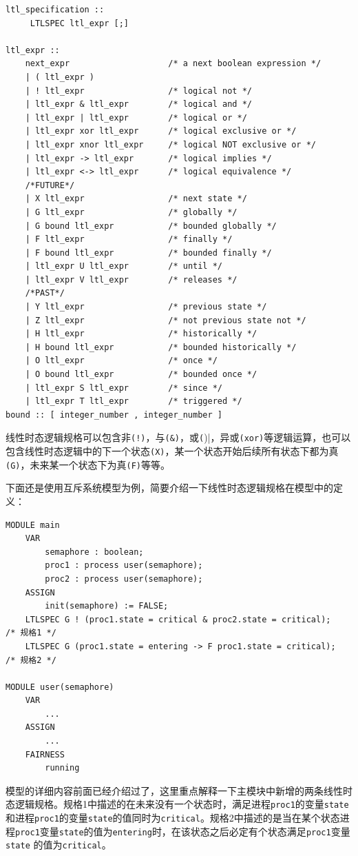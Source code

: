 \begin{lstlisting}
ltl_specification ::
     LTLSPEC ltl_expr [;]

ltl_expr ::
    next_expr                    /* a next boolean expression */
    | ( ltl_expr )
    | ! ltl_expr                 /* logical not */
    | ltl_expr & ltl_expr        /* logical and */
    | ltl_expr | ltl_expr        /* logical or */
    | ltl_expr xor ltl_expr      /* logical exclusive or */
    | ltl_expr xnor ltl_expr     /* logical NOT exclusive or */
    | ltl_expr -> ltl_expr       /* logical implies */
    | ltl_expr <-> ltl_expr      /* logical equivalence */
    /*FUTURE*/
    | X ltl_expr                 /* next state */
    | G ltl_expr                 /* globally */
    | G bound ltl_expr           /* bounded globally */
    | F ltl_expr                 /* finally */
    | F bound ltl_expr           /* bounded finally */
    | ltl_expr U ltl_expr        /* until */
    | ltl_expr V ltl_expr        /* releases */
    /*PAST*/
    | Y ltl_expr                 /* previous state */
    | Z ltl_expr                 /* not previous state not */
    | H ltl_expr                 /* historically */
    | H bound ltl_expr           /* bounded historically */
    | O ltl_expr                 /* once */
    | O bound ltl_expr           /* bounded once */
    | ltl_expr S ltl_expr        /* since */
    | ltl_expr T ltl_expr        /* triggered */
bound :: [ integer_number , integer_number ]
\end{lstlisting}

线性时态逻辑规格可以包含非\verb|(!)|，与\verb|(&)|，或\verb|(|)|，异或\verb|(xor)|等逻辑运算，也可以包含线性时态逻辑中的下一个状态\verb|(X)|，某一个状态开始后续所有状态下都为真\verb|(G)|，未来某一个状态下为真\verb|(F)|等等。

下面还是使用互斥系统模型为例，简要介绍一下线性时态逻辑规格在模型中的定义：

\begin{lstlisting}
MODULE main
    VAR
        semaphore : boolean;
        proc1 : process user(semaphore);
        proc2 : process user(semaphore);
    ASSIGN
        init(semaphore) := FALSE;
    LTLSPEC G ! (proc1.state = critical & proc2.state = critical);   /* 规格1 */
    LTLSPEC G (proc1.state = entering -> F proc1.state = critical);  /* 规格2 */

MODULE user(semaphore)
    VAR
        ...
    ASSIGN
        ...
    FAIRNESS
        running
\end{lstlisting}

模型的详细内容前面已经介绍过了，这里重点解释一下主模块中新增的两条线性时态逻辑规格。规格1中描述的在未来没有一个状态时，满足进程\verb|proc1|的变量\verb|state|和进程\verb|proc1|的变量\verb|state|的值同时为\verb|critical|。规格2中描述的是当在某个状态进程\verb|proc1|变量\verb|state|的值为\verb|entering|时，在该状态之后必定有个状态满足\verb|proc1|变量\verb|state| 的值为\verb|critical|。

